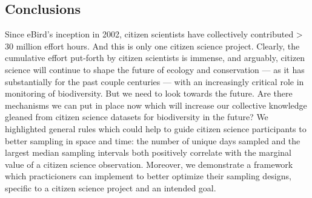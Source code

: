 \documentclass[9pt,twocolumn,twoside,lineno]{pnas-new}
\begin{document}
\subsection*{Conclusions}
Since eBird's inception in 2002, citizen scientists have collectively contributed > 30 million effort hours. And this is only one citizen science project. Clearly, the cumulative effort put-forth by citizen scientists is immense, and arguably, citizen science will continue to shape the future of ecology and conservation --- as it has substantially for the past couple centuries \cite{silvertown2009new} --- with an increasingly critical role \cite{mckinley2017citizen, pocock2018vision} in monitoring of biodiversity. But we need to look towards the future. Are there mechanisms we can put in place now which will increase our collective knowledge gleaned from citizen science datasets for biodiversity in the future? We highlighted general rules which could help to guide citizen science participants to better sampling in space and time: the number of unique days sampled and the largest median sampling intervals both positively correlate with the marginal value of a citizen science observation. Moreover, we demonstrate a framework which practicioners can implement to better optimize their sampling designs, specific to a citizen science project and an intended goal.
\end{document}

